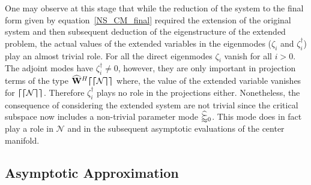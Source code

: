 One may observe at this stage that while the reduction of the system to the final form given by equation~\eqref{NS_CM_final} required the extension of the original system and then subsequent deduction of the eigenstructure of the extended problem, the actual values of the extended variables in the eigenmodes (\ie $\zeta_{i}$ and $\zeta_{i}^{\dagger}$) play an almost trivial role. For all the direct eigenmodes $\zeta_{i}$ vanish for all $i>0$. The adjoint modes have $\zeta_{i}^{\dagger} \ne 0$, however, they are only important in projection terms of the type $\mathbf{\widehat{W}}^{H}\boldsymbol{\lceil}\boldsymbol{\lceil}\mathcal{N}\boldsymbol{\rceil}\boldsymbol{\rceil}$ where, the value of the extended variable vanishes for $\boldsymbol{\lceil}\boldsymbol{\lceil}\mathcal{N}\boldsymbol{\rceil}\boldsymbol{\rceil}$. Therefore $\zeta_{i}^{\dagger}$ plays no role in the projections either. Nonetheless, the consequence of considering the extended system are not trivial since the critical subspace now includes a non-trivial parameter mode $\mathbb{\widehat{v}}_{0}$. This mode does in fact play a role in $\mathcal{N}$ and  in the subsequent asymptotic evaluations of the center manifold.

\subsection{Asymptotic Approximation}

